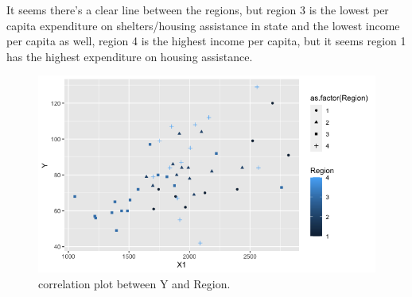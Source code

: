 \documentclass[12pt,letterpaper]{article}
\begin{document}
It seems there's a clear line between the regions, but region 3 is the lowest per capita expenditure on shelters/housing assistance in state and the lowest income per capita as well, region 4 is the highest income per capita, but it seems region 1 has the highest expenditure on housing assistance. 

  


\begin{figure}[h!]\centering
	\caption{\footnotesize correlation plot  between Y and Region.}
	\label{fig:plot_3}
	\includegraphics[width=.75\textwidth]{Correlation Y X1 & Region.png}
\end{figure}
\end{document}
